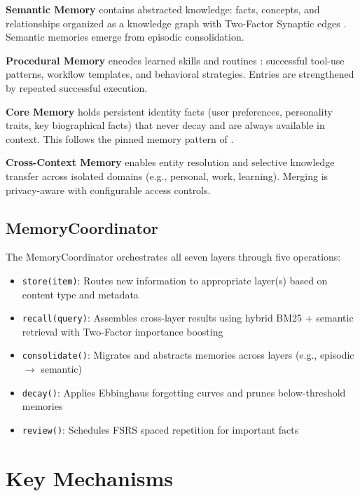 \documentclass{article}
\begin{document}
\textbf{Semantic Memory} contains abstracted knowledge: facts, concepts,
and relationships organized as a knowledge graph with Two-Factor Synaptic
edges \citep{tulving1972,zenke2025}.
Semantic memories emerge from episodic consolidation.

\textbf{Procedural Memory} encodes learned skills and routines \citep{cohen1980}:
successful tool-use patterns, workflow templates, and behavioral strategies.
Entries are strengthened by repeated successful execution.

\textbf{Core Memory} holds persistent identity facts (user preferences,
personality traits, key biographical facts) that never decay and are
always available in context.
This follows the pinned memory pattern of \citet{packer2023memgpt}.

\textbf{Cross-Context Memory} enables entity resolution and selective
knowledge transfer across isolated domains (e.g., personal, work, learning).
Merging is privacy-aware with configurable access controls.

\subsection{MemoryCoordinator}

The MemoryCoordinator orchestrates all seven layers through five operations:

\begin{itemize}
    \item \texttt{store(item)}: Routes new information to appropriate layer(s)
    based on content type and metadata
    \item \texttt{recall(query)}: Assembles cross-layer results using hybrid
    BM25 + semantic retrieval with Two-Factor importance boosting
    \item \texttt{consolidate()}: Migrates and abstracts memories across layers
    (e.g., episodic $\rightarrow$ semantic)
    \item \texttt{decay()}: Applies Ebbinghaus forgetting curves and prunes
    below-threshold memories
    \item \texttt{review()}: Schedules FSRS spaced repetition for important facts
\end{itemize}

\section{Key Mechanisms}
\label{sec:mechanisms}
\end{document}
